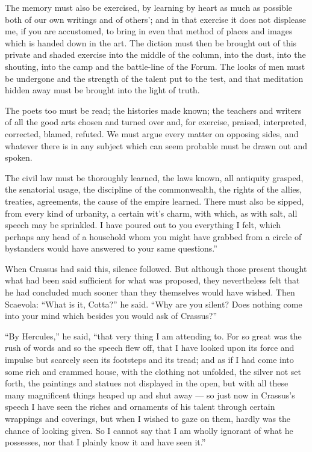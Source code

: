  The memory must also be exercised, by learning by heart as much as possible both of our own writings and of others'; and in that exercise it does not displease me, if you are accustomed, to bring in even that method of places and images which is handed down in the art. The diction must then be brought out of this private and shaded exercise into the middle of the column, into the dust, into the shouting, into the camp and the battle-line of the Forum. The looks of men must be undergone and the strength of the talent put to the test, and that meditation hidden away must be brought into the light of truth.

 The poets too must be read; the histories made known; the teachers and writers of all the good arts chosen and turned over and, for exercise, praised, interpreted, corrected, blamed, refuted. We must argue every matter on opposing sides, and whatever there is in any subject which can seem probable must be drawn out and spoken.

 The civil law must be thoroughly learned, the laws known, all antiquity grasped, the senatorial usage, the discipline of the commonwealth, the rights of the allies, treaties, agreements, the cause of the empire learned. There must also be sipped, from every kind of urbanity, a certain wit's charm, with which, as with salt, all speech may be sprinkled. I have poured out to you everything I felt, which perhaps any head of a household whom you might have grabbed from a circle of bystanders would have answered to your same questions.''

 When Crassus had said this, silence followed. But although those present thought what had been said sufficient for what was proposed, they nevertheless felt that he had concluded much sooner than they themselves would have wished. Then Scaevola: ``What is it, Cotta?'' he said. ``Why are you silent? Does nothing come into your mind which besides you would ask of Crassus?''

 ``By Hercules,'' he said, ``that very thing I am attending to. For so great was the rush of words and so the speech flew off, that I have looked upon its force and impulse but scarcely seen its footsteps and its tread; and as if I had come into some rich and crammed house, with the clothing not unfolded, the silver not set forth, the paintings and statues not displayed in the open, but with all these many magnificent things heaped up and shut away — so just now in Crassus's speech I have seen the riches and ornaments of his talent through certain wrappings and coverings, but when I wished to gaze on them, hardly was the chance of looking given. So I cannot say that I am wholly ignorant of what he possesses, nor that I plainly know it and have seen it.''

